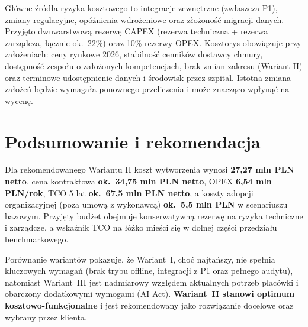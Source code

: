 Główne źródła ryzyka kosztowego to integracje zewnętrzne (zwłaszcza P1), zmiany regulacyjne, opóźnienia wdrożeniowe oraz złożoność migracji danych. Przyjęto dwuwarstwową rezerwę CAPEX (rezerwa techniczna + rezerwa zarządcza, łącznie ok.~22\%) oraz 10\% rezerwy OPEX. Kosztorys obowiązuje przy założeniach: ceny rynkowe 2026, stabilność cenników dostawcy chmury, dostępność zespołu o założonych kompetencjach, brak zmian zakresu (Wariant II) oraz terminowe udostępnienie danych i środowisk przez szpital. Istotna zmiana założeń będzie wymagała ponownego przeliczenia i może znacząco wpłynąć na wycenę.

\section{Podsumowanie i rekomendacja}
\label{sec:rekomendacja}

Dla rekomendowanego Wariantu II koszt wytworzenia wynosi \textbf{27,27 mln PLN netto}, cena kontraktowa \textbf{ok.~34,75 mln PLN netto}, OPEX \textbf{6,54 mln PLN/rok}, TCO 5 lat \textbf{ok.~67,5 mln PLN netto}, a koszty adopcji organizacyjnej (poza umową z wykonawcą) \textbf{ok.~5,5 mln PLN} w scenariuszu bazowym. Przyjęty budżet obejmuje konserwatywną rezerwę na ryzyka techniczne i zarządcze, a wskaźnik TCO na łóżko mieści się w dolnej części przedziału benchmarkowego.

Porównanie wariantów pokazuje, że Wariant~I, choć najtańszy, nie spełnia kluczowych wymagań (brak trybu offline, integracji z P1 oraz pełnego audytu), natomiast Wariant~III jest nadmiarowy względem aktualnych potrzeb placówki i obarczony dodatkowymi wymogami (AI Act). \textbf{Wariant~II stanowi optimum kosztowo-funkcjonalne} i jest rekomendowany jako rozwiązanie docelowe oraz wybrany przez klienta.
